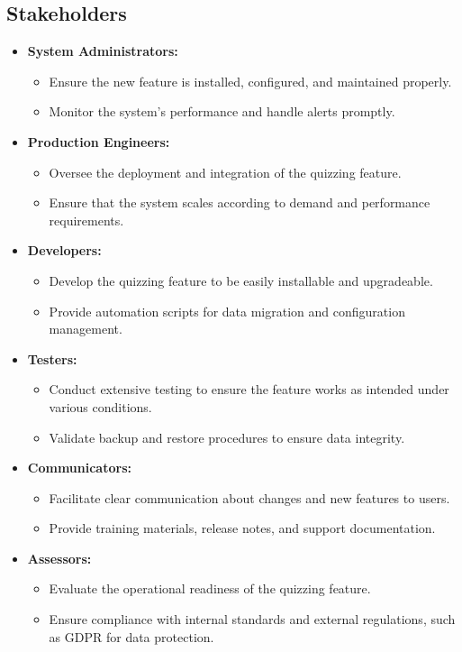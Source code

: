 \subsection{Stakeholders}

\begin{itemize}
    \item \textbf{System Administrators:}
          \begin{itemize}
              \item Ensure the new feature is installed, configured, and maintained properly.
              \item Monitor the system’s performance and handle alerts promptly.
          \end{itemize}
    \item \textbf{Production Engineers:}
          \begin{itemize}
              \item Oversee the deployment and integration of the quizzing feature.
              \item Ensure that the system scales according to demand and performance requirements.
          \end{itemize}
    \item \textbf{Developers:}
          \begin{itemize}
              \item Develop the quizzing feature to be easily installable and upgradeable.
              \item Provide automation scripts for data migration and configuration management.
          \end{itemize}
    \item \textbf{Testers:}
          \begin{itemize}
              \item Conduct extensive testing to ensure the feature works as intended under various conditions.
              \item Validate backup and restore procedures to ensure data integrity.
          \end{itemize}
    \item \textbf{Communicators:}
          \begin{itemize}
              \item Facilitate clear communication about changes and new features to users.
              \item Provide training materials, release notes, and support documentation.
          \end{itemize}
    \item \textbf{Assessors:}
          \begin{itemize}
              \item Evaluate the operational readiness of the quizzing feature.
              \item Ensure compliance with internal standards and external regulations, such as GDPR for data protection.
          \end{itemize}
\end{itemize}


